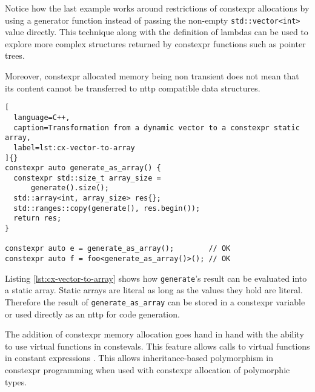 \documentclass[../main]{subfiles}
\begin{document}
Notice how the last example works around restrictions of \gls{constexpr} allocations
by using a generator function instead of passing the non-empty
\lstinline{std::vector<int>} value directly. This technique along with the
definition of lambdas can be used to explore more complex structures returned by
\gls{constexpr} functions such as pointer trees.

Moreover, \gls{constexpr} allocated memory being non transient does not mean that its
content cannot be transferred to \gls{nttp} compatible data structures.

\begin{lstlisting}[
  language=C++,
  caption=Transformation from a dynamic vector to a constexpr static array,
  label=lst:cx-vector-to-array
]{}
constexpr auto generate_as_array() {
  constexpr std::size_t array_size =
      generate().size();
  std::array<int, array_size> res{};
  std::ranges::copy(generate(), res.begin());
  return res;
}

constexpr auto e = generate_as_array();        // OK
constexpr auto f = foo<generate_as_array()>(); // OK
\end{lstlisting}

Listing \ref{lst:cx-vector-to-array} shows how \lstinline{generate}'s result
can be evaluated into a static array. Static arrays are literal as long
as the values they hold are literal. Therefore the result of
\lstinline{generate_as_array} can be stored in a \gls{constexpr} variable or
used directly as an \gls{nttp} for code generation.

The addition of \gls{constexpr} memory allocation goes hand in hand
with the ability to use virtual functions in \glspl{consteval}.
This feature allows calls to virtual functions in constant expressions
\cite{virtual-constexpr}. This allows inheritance-based polymorphism in
\gls{constexpr} programming when used with \gls{constexpr} allocation of
polymorphic types.


%
\end{document}
